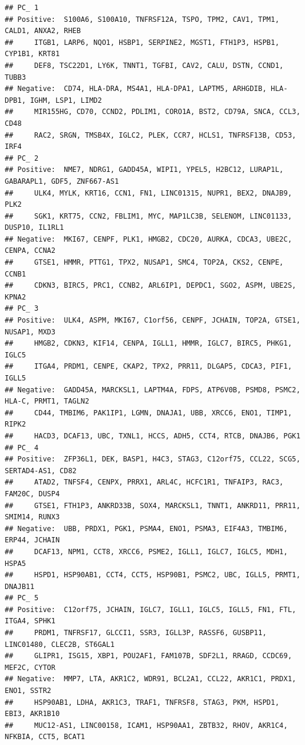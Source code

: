 \documentclass[
  openany]{book}
\begin{document}
\begin{verbatim}
## PC_ 1 
## Positive:  S100A6, S100A10, TNFRSF12A, TSPO, TPM2, CAV1, TPM1, CALD1, ANXA2, RHEB 
##     ITGB1, LARP6, NQO1, HSBP1, SERPINE2, MGST1, FTH1P3, HSPB1, CYP1B1, KRT81 
##     DEF8, TSC22D1, LY6K, TNNT1, TGFBI, CAV2, CALU, DSTN, CCND1, TUBB3 
## Negative:  CD74, HLA-DRA, MS4A1, HLA-DPA1, LAPTM5, ARHGDIB, HLA-DPB1, IGHM, LSP1, LIMD2 
##     MIR155HG, CD70, CCND2, PDLIM1, CORO1A, BST2, CD79A, SNCA, CCL3, CD48 
##     RAC2, SRGN, TMSB4X, IGLC2, PLEK, CCR7, HCLS1, TNFRSF13B, CD53, IRF4 
## PC_ 2 
## Positive:  NME7, NDRG1, GADD45A, WIPI1, YPEL5, H2BC12, LURAP1L, GABARAPL1, GDF5, ZNF667-AS1 
##     ULK4, MYLK, KRT16, CCN1, FN1, LINC01315, NUPR1, BEX2, DNAJB9, PLK2 
##     SGK1, KRT75, CCN2, FBLIM1, MYC, MAP1LC3B, SELENOM, LINC01133, DUSP10, IL1RL1 
## Negative:  MKI67, CENPF, PLK1, HMGB2, CDC20, AURKA, CDCA3, UBE2C, CENPA, CCNA2 
##     GTSE1, HMMR, PTTG1, TPX2, NUSAP1, SMC4, TOP2A, CKS2, CENPE, CCNB1 
##     CDKN3, BIRC5, PRC1, CCNB2, ARL6IP1, DEPDC1, SGO2, ASPM, UBE2S, KPNA2 
## PC_ 3 
## Positive:  ULK4, ASPM, MKI67, C1orf56, CENPF, JCHAIN, TOP2A, GTSE1, NUSAP1, MXD3 
##     HMGB2, CDKN3, KIF14, CENPA, IGLL1, HMMR, IGLC7, BIRC5, PHKG1, IGLC5 
##     ITGA4, PRDM1, CENPE, CKAP2, TPX2, PRR11, DLGAP5, CDCA3, PIF1, IGLL5 
## Negative:  GADD45A, MARCKSL1, LAPTM4A, FDPS, ATP6V0B, PSMD8, PSMC2, HLA-C, PRMT1, TAGLN2 
##     CD44, TMBIM6, PAK1IP1, LGMN, DNAJA1, UBB, XRCC6, ENO1, TIMP1, RIPK2 
##     HACD3, DCAF13, UBC, TXNL1, HCCS, ADH5, CCT4, RTCB, DNAJB6, PGK1 
## PC_ 4 
## Positive:  ZFP36L1, DEK, BASP1, H4C3, STAG3, C12orf75, CCL22, SCG5, SERTAD4-AS1, CD82 
##     ATAD2, TNFSF4, CENPX, PRRX1, ARL4C, HCFC1R1, TNFAIP3, RAC3, FAM20C, DUSP4 
##     GTSE1, FTH1P3, ANKRD33B, SOX4, MARCKSL1, TNNT1, ANKRD11, PRR11, SMIM14, RUNX3 
## Negative:  UBB, PRDX1, PGK1, PSMA4, ENO1, PSMA3, EIF4A3, TMBIM6, ERP44, JCHAIN 
##     DCAF13, NPM1, CCT8, XRCC6, PSME2, IGLL1, IGLC7, IGLC5, MDH1, HSPA5 
##     HSPD1, HSP90AB1, CCT4, CCT5, HSP90B1, PSMC2, UBC, IGLL5, PRMT1, DNAJB11 
## PC_ 5 
## Positive:  C12orf75, JCHAIN, IGLC7, IGLL1, IGLC5, IGLL5, FN1, FTL, ITGA4, SPHK1 
##     PRDM1, TNFRSF17, GLCCI1, SSR3, IGLL3P, RASSF6, GUSBP11, LINC01480, CLEC2B, ST6GAL1 
##     GLIPR1, ISG15, XBP1, POU2AF1, FAM107B, SDF2L1, RRAGD, CCDC69, MEF2C, CYTOR 
## Negative:  MMP7, LTA, AKR1C2, WDR91, BCL2A1, CCL22, AKR1C1, PRDX1, ENO1, SSTR2 
##     HSP90AB1, LDHA, AKR1C3, TRAF1, TNFRSF8, STAG3, PKM, HSPD1, EBI3, AKR1B10 
##     MUC12-AS1, LINC00158, ICAM1, HSP90AA1, ZBTB32, RHOV, AKR1C4, NFKBIA, CCT5, BCAT1
\end{verbatim}
\end{document}
